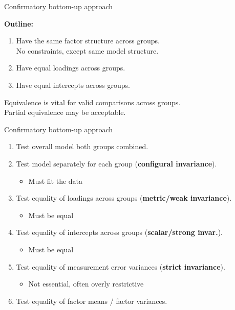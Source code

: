 \documentclass[10pt]{beamer}\usepackage[]{graphicx}\usepackage[]{xcolor}
\begin{document}
%
\begin{frame}[fragile]{Confirmatory bottom-up approach}

\textbf{Outline:}
    \begin{enumerate}
        \item Have the same factor structure across groups.\\
        No constraints, except same model structure.
        \item Have equal loadings across groups.
        \item Have equal intercepts across groups.
    \end{enumerate}
\vspace{5mm}
Equivalence is vital for valid comparisons across groups.\\
Partial equivalence may be acceptable. 
\end{frame}
%
\begin{frame}[fragile]{Confirmatory bottom-up approach}
\begin{enumerate}
    \item Test overall model both groups combined.
    \item Test model separately for each group (\textbf{configural invariance}).
    \begin{itemize}
        \item Must fit the data
    \end{itemize}
    \item Test equality of loadings across groups (\textbf{metric/weak invariance}).
    \begin{itemize}
        \item Must be equal
    \end{itemize}
    \item Test equality of intercepts across groups (\textbf{scalar/strong invar.}).
    \begin{itemize}
        \item Must be equal
    \end{itemize}
    \item Test equality of measurement error variances (\textbf{strict invariance}).
    \begin{itemize}
        \item Not essential, often overly restrictive
    \end{itemize}
    \item Test equality of factor means / factor variances.
\end{enumerate}

\end{frame}
\end{document}
